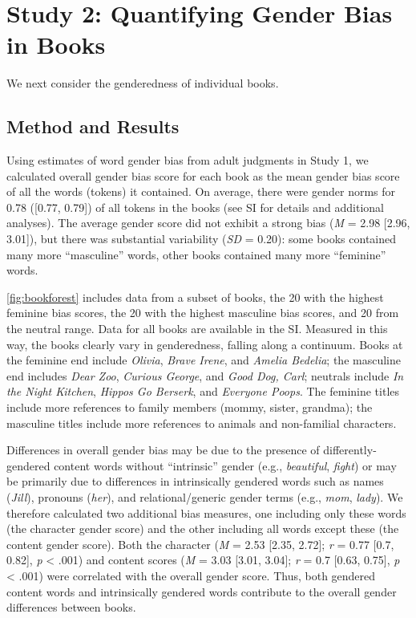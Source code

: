 \documentclass[english,,man,floatsintext]{apa6}
\begin{document}
\hypertarget{study-2-quantifying-gender-bias-in-books}{%
\section{Study 2: Quantifying Gender Bias in Books}\label{study-2-quantifying-gender-bias-in-books}}

We next consider the genderedness of individual books.

\hypertarget{method-and-results-1}{%
\subsection{Method and Results}\label{method-and-results-1}}

Using estimates of word gender bias from adult judgments in Study 1, we calculated overall gender bias score for each book as the mean gender bias score of all the words (tokens) it contained. On average, there were gender norms for 0.78 ({[}0.77, 0.79{]}) of all tokens in the books (see SI for details and additional analyses). The average gender score did not exhibit a strong bias (\emph{M} = 2.98 {[}2.96, 3.01{]}), but there was substantial variability (\emph{SD} = 0.20): some books contained many more \enquote{masculine} words, other books contained many more \enquote{feminine} words.

\autoref{fig:bookforest} includes data from a subset of books, the 20 with the highest feminine bias scores, the 20 with the highest masculine bias scores, and 20 from the neutral range. Data for all books are available in the SI. Measured in this way, the books clearly vary in genderedness, falling along a continuum. Books at the feminine end include \emph{Olivia}, \emph{Brave Irene}, and \emph{Amelia Bedelia}; the masculine end includes \emph{Dear Zoo}, \emph{Curious George}, and \emph{Good Dog, Carl}; neutrals include \emph{In the Night Kitchen}, \emph{Hippos Go Berserk}, and \emph{Everyone Poops}. The feminine titles include more references to family members (mommy, sister, grandma); the masculine titles include more references to animals and non-familial characters.

Differences in overall gender bias may be due to the presence of differently-gendered content words without \enquote{intrinsic} gender (e.g., \emph{beautiful}, \emph{fight}) or may be primarily due to differences in intrinsically gendered words such as names (\emph{Jill}), pronouns (\emph{her}), and relational/generic gender terms (e.g., \emph{mom}, \emph{lady}). We therefore calculated two additional bias measures, one including only these words (the character gender score) and the other including all words except these (the content gender score). Both the character (\emph{M} = 2.53 {[}2.35, 2.72{]}; \emph{r} = 0.77 {[}0.7, 0.82{]}, \emph{p} \textless{} .001) and content scores (\emph{M} = 3.03 {[}3.01, 3.04{]}; \emph{r} = 0.7 {[}0.63, 0.75{]}, \emph{p} \textless{} .001) were correlated with the overall gender score. Thus, both gendered content words and intrinsically gendered words contribute to the overall gender differences between books.
\end{document}
